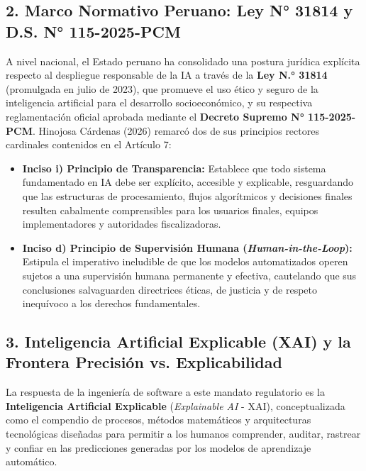 \documentclass[12pt,a4paper]{article}
\begin{document}
\subsection*{2. Marco Normativo Peruano: Ley N° 31814 y D.S. N° 115-2025-PCM}
A nivel nacional, el Estado peruano ha consolidado una postura jurídica explícita respecto al despliegue responsable de la IA a través de la \textbf{Ley N.° 31814} (promulgada en julio de 2023), que promueve el uso ético y seguro de la inteligencia artificial para el desarrollo socioeconómico, y su respectiva reglamentación oficial aprobada mediante el \textbf{Decreto Supremo N° 115-2025-PCM}. Hinojosa Cárdenas (2026) remarcó dos de sus principios rectores cardinales contenidos en el Artículo 7:
\begin{itemize}
    \item \textbf{Inciso i) Principio de Transparencia:} Establece que todo sistema fundamentado en IA debe ser explícito, accesible y explicable, resguardando que las estructuras de procesamiento, flujos algorítmicos y decisiones finales resulten cabalmente comprensibles para los usuarios finales, equipos implementadores y autoridades fiscalizadoras.
    \item \textbf{Inciso d) Principio de Supervisión Humana (\textit{Human-in-the-Loop}):} Estipula el imperativo ineludible de que los modelos automatizados operen sujetos a una supervisión humana permanente y efectiva, cautelando que sus conclusiones salvaguarden directrices éticas, de justicia y de respeto inequívoco a los derechos fundamentales.
\end{itemize}

\subsection*{3. Inteligencia Artificial Explicable (XAI) y la Frontera Precisión vs. Explicabilidad}
La respuesta de la ingeniería de software a este mandato regulatorio es la \textbf{Inteligencia Artificial Explicable} (\textit{Explainable AI} - XAI), conceptualizada como el compendio de procesos, métodos matemáticos y arquitecturas tecnológicas diseñadas para permitir a los humanos comprender, auditar, rastrear y confiar en las predicciones generadas por los modelos de aprendizaje automático.
\end{document}

